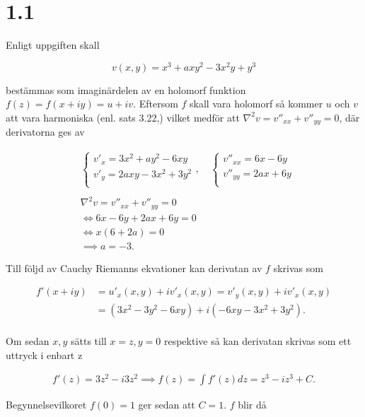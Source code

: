 \documentclass[a4paper]{article}
\begin{document}
\section*{1.1}

Enligt uppgiften skall

\begin{equation*}
	v(x,y) = x^3 + axy^2 - 3x^2y + y^3
\end{equation*}

bestämmas som imaginärdelen av en holomorf funktion $f(z) = f(x + iy) = u + iv$. Eftersom $f$ skall vara holomorf så kommer $u$ och $v$ att vara harmoniska (enl. sats 3.22,) vilket medför att $\nabla^2v = v''_{xx} + v''_{yy} = 0$, där derivatorna ges av

\begin{align*}
	&\begin{cases}
		v'_x = 3x^2 + ay^2 - 6xy\\
		v'_y = 2axy - 3x^2 + 3y^2\\
	\end{cases}
	,\quad
	\begin{cases}
		v''_{xx} = 6x - 6y\\
		v''_{yy} = 2ax + 6y\\
	\end{cases}\\
	&\\
	&\nabla^2v = v''_{xx} + v''_{yy} = 0\\
	&\iff 6x - 6y + 2ax + 6y = 0\\
	&\iff x(6+2a) = 0\\
	&\implies a = -3.
\end{align*}

Till följd av Cauchy Riemanns ekvationer kan derivatan av $f$ skrivas som 

\begin{align*}
	f'(x + iy)	&= u'_x(x,y) + iv'_x(x,y) = v'_y(x,y) + iv'_x(x,y)\\
				&= (3x^2 - 3y^2 - 6xy) + i(-6xy - 3x^2 + 3y^2).\\
\end{align*}

Om sedan $x,y$ sätts till $x = z, y = 0$ respektive så kan derivatan skrivas som ett uttryck i enbart z

\begin{align*}
	f'(z) = 3z^2 - i3z^2
	\implies f(z) = \int f'(z)dz = z^3 - iz^3 + C.
\end{align*}

Begynnelsevilkoret $f(0) = 1$ ger sedan att $C = 1$. $f$ blir då
\end{document}

